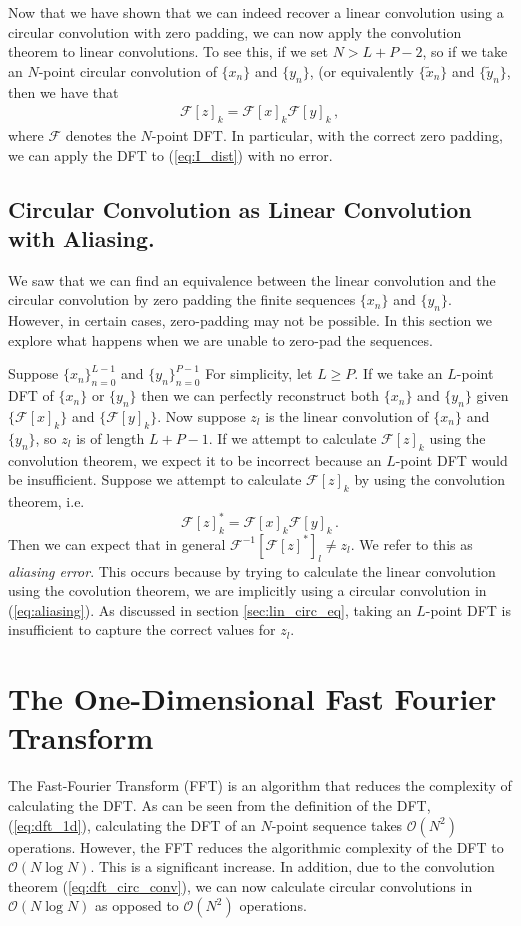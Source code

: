 \documentclass[12pt]{CSUNthesis}
\def\calF{\mathcal{F}}
\begin{document}
	Now that we have shown that we can indeed recover a linear convolution using a circular convolution with zero padding, we can now apply the convolution theorem to linear convolutions.  To see this, if we set $N > L+P-2$, so if we take an $N$-point circular convolution of $\{x_n\}$ and $\{y_n\}$, (or equivalently $\{\tilde{x}_n\}$ and $\{\tilde{y}_n\}$, then we have that
\begin{align*}
\calF[z]_k = \calF[x]_k \calF[y]_k\, ,
\end{align*}
where $\calF$ denotes the $N$-point DFT. In particular, with the correct zero padding, we can apply the DFT to (\ref{eq:I_dist}) with no error.
\subsection{Circular Convolution as Linear Convolution with Aliasing.}

We saw that we can find an equivalence between the linear convolution and the circular convolution by zero padding the finite sequences $\{ x_n\}$ and $\{y_n\}$. However, in certain cases, zero-padding may not be possible. In this section we explore what happens when we are unable to zero-pad the sequences.

Suppose $\{x_n\}_{n=0}^{L-1}$ and $\{y_n\}_{n=0}^{P-1}$ For simplicity, let $L \geq P$. If we take an $L$-point DFT of $\{x_n\}$ or $\{y_n\}$ then we can perfectly reconstruct both $\{x_n\}$ and $\{y_n\}$ given $\{ \calF[x]_k \}$ and $\{ \calF[y]_k \}$. Now suppose $z_l$ is the linear convolution of $\{x_n\}$ and $\{y_n\}$, so $z_l$ is of length $L+P-1$. 
If we attempt to calculate $\calF[z]_k$ using the convolution theorem, we expect it to be incorrect because an $L$-point DFT would be insufficient. 
Suppose we attempt to calculate $\calF[z]_k$ by using the convolution theorem, i.e. 
\begin{equation}
\label{eq:aliasing}
\calF[z]_k^* = \calF[x]_k \calF[y]_k \, . 
\end{equation}
Then we can expect that in general $\calF^{-1}[\calF[z]^*]_l \not = z_l$. We refer to this as \textit{aliasing error}. This occurs because by trying to calculate the linear convolution using the covolution theorem, we are implicitly using a circular convolution in (\ref{eq:aliasing}). As discussed in section \ref{sec:lin_circ_eq}, taking an $L$-point DFT is insufficient to capture the correct values for $z_l$. 

\section{The One-Dimensional Fast Fourier Transform}
The Fast-Fourier Transform (FFT) is an algorithm that reduces the complexity of calculating the DFT. As can be seen from the definition of the DFT, (\ref{eq:dft_1d}), calculating the DFT of an $N$-point sequence takes $\mathcal{O}(N^2)$ operations. However, the FFT reduces the algorithmic complexity of the DFT to $\mathcal{O}(N \log N)$. This is a significant increase. In addition, due to the convolution theorem (\ref{eq:dft_circ_conv}), we can now calculate circular convolutions in $\mathcal{O}(N \log N)$ as opposed to $\mathcal{O}(N^2)$ operations.
\end{document}
